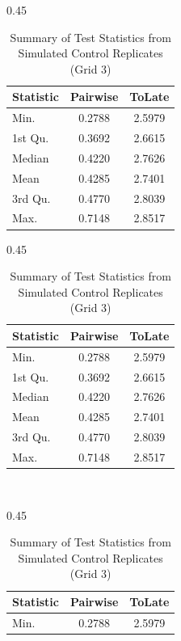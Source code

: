 \begin{table}[!htb]
\centering
\begin{subtable}[t]{0.45\textwidth}
\centering
 \begin{table}[!h]
\centering
\caption{Summary of Test Statistics from Simulated Control Replicates (Grid 1)}
\centering
\begin{tabular}[t]{lcc}
\toprule
Statistic & Pairwise & ToLate\\
\midrule
Min. & 0.2788 & 2.5979\\
1st Qu. & 0.3692 & 2.6615\\
Median & 0.4220 & 2.7626\\
Mean & 0.4285 & 2.7401\\
3rd Qu. & 0.4770 & 2.8039\\
\addlinespace
Max. & 0.7148 & 2.8517\\
\bottomrule
\end{tabular}
\end{table} 
\end{subtable}
\hfill
\begin{subtable}[t]{0.45\textwidth}
\centering
 \begin{table}[!h]
\centering
\caption{Summary of Test Statistics from Simulated Control Replicates (Grid 2)}
\centering
\begin{tabular}[t]{lcc}
\toprule
Statistic & Pairwise & ToLate\\
\midrule
Min. & 0.2788 & 2.5979\\
1st Qu. & 0.3692 & 2.6615\\
Median & 0.4220 & 2.7626\\
Mean & 0.4285 & 2.7401\\
3rd Qu. & 0.4770 & 2.8039\\
\addlinespace
Max. & 0.7148 & 2.8517\\
\bottomrule
\end{tabular}
\end{table} 
\end{subtable}\\[-0.5em]
\vspace{1em}
\begin{subtable}[t]{0.45\textwidth}
\centering
 \begin{table}[!h]
\centering
\caption{Summary of Test Statistics from Simulated Control Replicates (Grid 3)}
\centering
\begin{tabular}[t]{lcc}
\toprule
Statistic & Pairwise & ToLate\\
\midrule
Min. & 0.2788 & 2.5979\\

\end{tabular}
\end{table}
\end{subtable}
\end{table}
